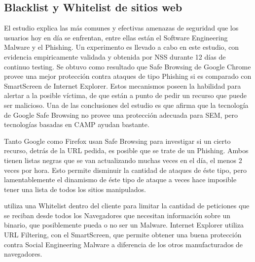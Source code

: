 
 \subsection{Blacklist y Whitelist de sitios web}

    El estudio \cite{browSecPhish} explica las más comunes y efectivas amenazas de seguridad que los usuarios hoy en día se enfrentan, entre ellas están el Software Engineering Malware y el Phishing. Un experimento es llevado a cabo en este estudio, con evidencia empiricamente validada y obtenida por NSS durante 12 días de continuo testing. Se obtuvo como resultado que Safe Browsing de Google Chrome provee una mejor protección contra ataques de tipo Phishing si es comparado con SmartScreen de Internet Explorer. Estos mecanismos poseen la habilidad para alertar a la posible víctima, de  que están a punto de pedir un recurso que puede ser malicioso. Una de las conclusiones del estudio \cite{rowSecSEMBlock} es que afirma que la tecnología de Google Safe Browsing no provee una protección adecuada para SEM, pero tecnologías basadas en CAMP ayudan bastante.

    Tanto Google como Firefox usan Safe Browsing para investigar si un cierto recurso, detrás de la URL pedida, es posible que se trate de un Phishing. Ambos tienen listas negras que se van actualizando muchas veces en el día, el menos 2 veces por hora. Esto permite disminuir la cantidad de ataques de éste tipo, pero lamentablemente el dinamismo de éste tipo de ataque a veces hace imposible tener una lista de todos los sitios manipulados.

    \cite{Rajab2013} utiliza una Whitelist dentro del cliente para limitar la cantidad de peticiones que se reciban desde todos los Navegadores que necesitan información sobre un binario, que posiblemente pueda o no ser un Malware.
    Internet Explorer utiliza URL Filtering, con el SmartScreen, que permite obtener una buena protección contra Social Engineering Malware \cite{rowSecSEMBlock} a diferencia de los otros manufacturados de navegadores.

